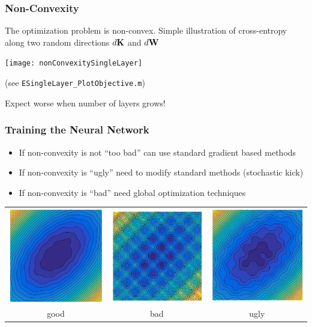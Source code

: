 \documentclass[12pt,fleqn,handout]{beamer}
\begin{document}
\begin{frame}
	\frametitle{Non-Convexity}
	The optimization problem is non-convex. Simple illustration of cross-entropy along two random directions $d{\bf K}$ and $d{\bf W}$

	\begin{center}
		\texttt{[image: nonConvexitySingleLayer]}
		
		(see \texttt{ESingleLayer\_PlotObjective.m})
	\bigskip
	
	Expect worse when number of layers grows!
	\end{center}

\end{frame}
\begin{frame}[fragile]\frametitle{Training the Neural Network}

\begin{itemize}
\item If non-convexity is not ``too bad'' can use standard gradient based methods
\item If non-convexity is ``ugly'' need to modify standard methods (stochastic kick)
\item If non-convexity is ``bad'' need global optimization techniques
\end{itemize}

	\begin{center}
	\begin{tabular}{ccc}
		\includegraphics[width=.3\textwidth]{images/goodConv} &
		\includegraphics[width=.3\textwidth]{images/badConv} &
		\includegraphics[width=.3\textwidth]{images/uglyConv} \\
		good & bad & ugly \\
		\end{tabular}
		\end{center}



\end{frame}
\end{document}
